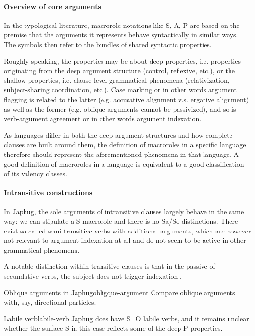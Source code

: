 \documentclass[a4paper, oneside, 12pt]{report}
\newcommand*{\citesec}[1]{\S~{#1}}
\begin{document}
\paragraph*{Overview of core arguments}
In the typological literature, macrorole notations like S, A, P 
are based on the premise that the arguments it represents
behave syntactically in similar ways.
The symbols then refer to the bundles of shared syntactic properties.

Roughly speaking, the properties may be about deep properties, 
i.e. properties originating from the deep argument structure
(control, reflexive, etc.), 
or the shallow properties, i.e. clause-level grammatical phenomena
(relativization, subject-sharing coordination, etc.).
Case marking or in other words argument flagging 
is related to the latter (e.g. accusative alignment v.s. ergative alignment)
as well as the former (e.g. oblique arguments cannot be passivized),
and so is verb-argument agreement or in other words argument indexation.

As languages differ in both the deep argument structures
and how complete clauses are built around them,
the definition of macroroles in a specific language therefore should represent 
the aforementioned phenomena in that language.
A good definition of macroroles in a language
is equivalent to a good classification of its valency classes.

\paragraph*{Intransitive constructions}
In Japhug, the sole arguments of intransitive clauses largely behave in the same way:
we can stipulate a S macrorole and there is no Sa/So distinctions. 
There exist so-called semi-transitive verbs with additional arguments,
which are however not relevant to argument indexation at all
\citep[\citesec{14.2.5}]{jacques2021grammar}
and do not seem to be active in other grammatical phenomena.

A notable distinction within transitive clauses
is that in the passive of secundative verbs,
the subject does not trigger indexation
\citep[\citesec{18.1.4}]{jacques2021grammar}.

\begin{todobox}{Oblique arguments in Japhug}{obligque-argument}
    Compare oblique arguments with, say, directional particles.
\end{todobox}

\begin{todobox}{Labile verb}{labile-verb}
    Japhug does have S=O labile verbs,
    and it remains unclear whether the surface S in this case
    reflects some of the deep P properties. 
\end{todobox}
\end{document}
